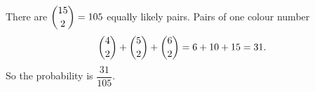 There are $\dbinom{15}{2}=105$ equally likely pairs. Pairs of one colour number
\[
\dbinom42+\dbinom52+\dbinom62=6+10+15=31 .
\]
So the probability is $\boxed{\dfrac{31}{105}}$.
